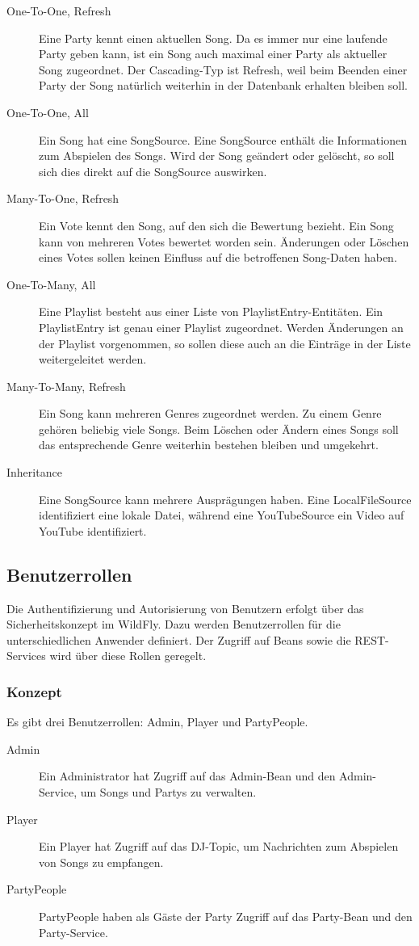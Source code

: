 \begin{description}
	\item[One-To-One, Refresh] Eine Party kennt einen aktuellen Song. Da es immer nur eine laufende Party geben kann, ist ein Song auch maximal einer Party als aktueller Song zugeordnet. Der Cascading-Typ ist Refresh, weil beim Beenden einer Party der Song natürlich weiterhin in der Datenbank erhalten bleiben soll.
	\item[One-To-One, All] Ein Song hat eine SongSource. Eine SongSource enthält die Informationen zum Abspielen des Songs. Wird der Song geändert oder gelöscht, so soll sich dies direkt auf die SongSource auswirken.
	\item[Many-To-One, Refresh] Ein Vote kennt den Song, auf den sich die Bewertung bezieht. Ein Song kann von mehreren Votes bewertet worden sein. Änderungen oder Löschen eines Votes sollen keinen Einfluss auf die betroffenen Song-Daten haben.
	\item[One-To-Many, All] Eine Playlist besteht aus einer Liste von PlaylistEntry-Entitäten. Ein PlaylistEntry ist genau einer Playlist zugeordnet. Werden Änderungen an der Playlist vorgenommen, so sollen diese auch an die Einträge
	in der Liste weitergeleitet werden.
	\item[Many-To-Many, Refresh] Ein Song kann mehreren Genres zugeordnet werden. Zu einem Genre gehören beliebig viele Songs. Beim Löschen oder Ändern eines Songs soll das entsprechende Genre weiterhin bestehen bleiben und umgekehrt.
	\item[Inheritance] Eine SongSource kann mehrere Ausprägungen haben. Eine LocalFileSource identifiziert eine lokale Datei, während eine YouTubeSource ein Video auf YouTube identifiziert.
\end{description}



\subsection{Benutzerrollen}
\label{sec:Benutzerrollen}
Die Authentifizierung und Autorisierung von Benutzern erfolgt über das Sicherheitskonzept im WildFly. Dazu werden Benutzerrollen für die unterschiedlichen Anwender definiert. Der Zugriff auf Beans sowie die REST-Services wird über diese Rollen geregelt. 

\newpage
\subsubsection{Konzept}
Es gibt drei Benutzerrollen: Admin, Player und PartyPeople.
\begin{description}
	\item[Admin] Ein Administrator hat Zugriff auf das Admin-Bean und den Admin-Service, um Songs und Partys zu verwalten.
	\item[Player] Ein Player hat Zugriff auf das DJ-Topic, um Nachrichten zum Abspielen von Songs zu empfangen.
	\item[PartyPeople] PartyPeople haben als Gäste der Party Zugriff auf das Party-Bean und den Party-Service.
\end{description}

